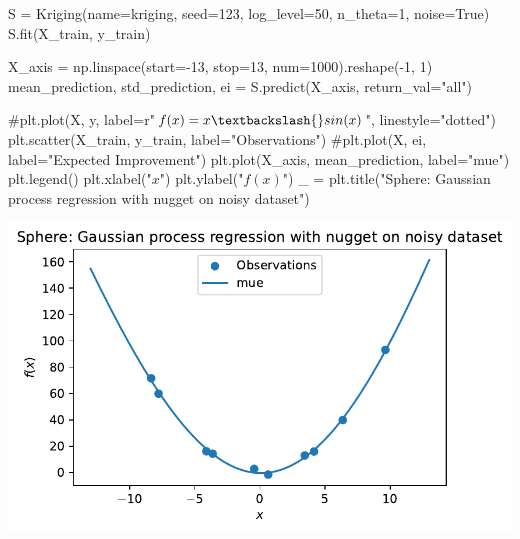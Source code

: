 \documentclass[
  letterpaper,
  DIV=11,
  numbers=noendperiod]{scrreprt}
\newenvironment{Shaded}{\begin{snugshade}}{\end{snugshade}}
\newcommand{\CommentTok}[1]{\textcolor[rgb]{0.37,0.37,0.37}{#1}}
\newcommand{\DecValTok}[1]{\textcolor[rgb]{0.68,0.00,0.00}{#1}}
\newcommand{\NormalTok}[1]{\textcolor[rgb]{0.00,0.23,0.31}{#1}}
\newcommand{\OperatorTok}[1]{\textcolor[rgb]{0.37,0.37,0.37}{#1}}
\newcommand{\StringTok}[1]{\textcolor[rgb]{0.13,0.47,0.30}{#1}}
\newcommand{\VariableTok}[1]{\textcolor[rgb]{0.07,0.07,0.07}{#1}}
\begin{document}
\begin{Shaded}
\begin{Highlighting}[]
\NormalTok{S }\OperatorTok{=}\NormalTok{ Kriging(name}\OperatorTok{=}\StringTok{\textquotesingle{}kriging\textquotesingle{}}\NormalTok{,}
\NormalTok{            seed}\OperatorTok{=}\DecValTok{123}\NormalTok{,}
\NormalTok{            log\_level}\OperatorTok{=}\DecValTok{50}\NormalTok{,}
\NormalTok{            n\_theta}\OperatorTok{=}\DecValTok{1}\NormalTok{,}
\NormalTok{            noise}\OperatorTok{=}\VariableTok{True}\NormalTok{)}
\NormalTok{S.fit(X\_train, y\_train)}

\NormalTok{X\_axis }\OperatorTok{=}\NormalTok{ np.linspace(start}\OperatorTok{={-}}\DecValTok{13}\NormalTok{, stop}\OperatorTok{=}\DecValTok{13}\NormalTok{, num}\OperatorTok{=}\DecValTok{1000}\NormalTok{).reshape(}\OperatorTok{{-}}\DecValTok{1}\NormalTok{, }\DecValTok{1}\NormalTok{)}
\NormalTok{mean\_prediction, std\_prediction, ei }\OperatorTok{=}\NormalTok{ S.predict(X\_axis, return\_val}\OperatorTok{=}\StringTok{"all"}\NormalTok{)}

\CommentTok{\#plt.plot(X, y, label=r"$f(x) = x \textbackslash{}sin(x)$", linestyle="dotted")}
\NormalTok{plt.scatter(X\_train, y\_train, label}\OperatorTok{=}\StringTok{"Observations"}\NormalTok{)}
\CommentTok{\#plt.plot(X, ei, label="Expected Improvement")}
\NormalTok{plt.plot(X\_axis, mean\_prediction, label}\OperatorTok{=}\StringTok{"mue"}\NormalTok{)}
\NormalTok{plt.legend()}
\NormalTok{plt.xlabel(}\StringTok{"$x$"}\NormalTok{)}
\NormalTok{plt.ylabel(}\StringTok{"$f(x)$"}\NormalTok{)}
\NormalTok{\_ }\OperatorTok{=}\NormalTok{ plt.title(}\StringTok{"Sphere: Gaussian process regression with nugget on noisy dataset"}\NormalTok{)}
\end{Highlighting}
\end{Shaded}

\includegraphics{012_num_spot_ei_files/figure-pdf/cell-51-output-1.pdf}
\end{document}
